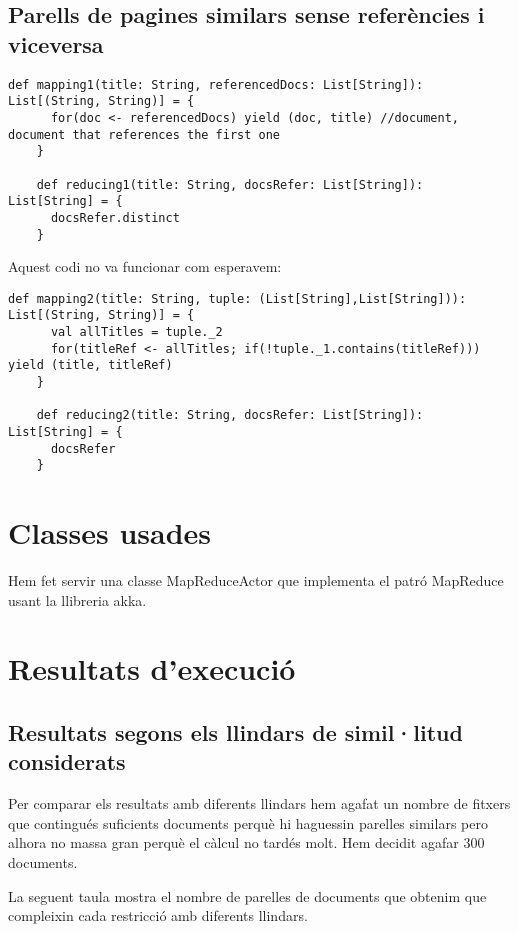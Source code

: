 \documentclass{report}
\begin{document}
\section{Parells de pagines similars sense referències i viceversa}

\begin{lstlisting}[style=scalaHighlight]
    def mapping1(title: String, referencedDocs: List[String]): List[(String, String)] = {
      for(doc <- referencedDocs) yield (doc, title) //document, document that references the first one
    }
  
    def reducing1(title: String, docsRefer: List[String]): List[String] = {
      docsRefer.distinct
    }
\end{lstlisting}

Aquest codi no va funcionar com esperavem:
\begin{lstlisting}[style=scalaHighlight]
    def mapping2(title: String, tuple: (List[String],List[String])): List[(String, String)] = {
      val allTitles = tuple._2
      for(titleRef <- allTitles; if(!tuple._1.contains(titleRef))) yield (title, titleRef)
    }
  
    def reducing2(title: String, docsRefer: List[String]): List[String] = {
      docsRefer
    }
\end{lstlisting}


\chapter{Classes usades}

Hem fet servir una classe MapReduceActor que implementa el patró MapReduce usant la llibreria akka.


\chapter{Resultats d'execució}

\section{Resultats segons els llindars de simil·litud considerats}

Per comparar els resultats amb diferents llindars hem agafat un nombre de fitxers que contingués suficients documents perquè hi haguessin parelles similars pero alhora no massa gran perquè el càlcul no tardés molt. Hem decidit agafar 300 documents.

La seguent taula mostra el nombre de parelles de documents que obtenim que compleixin cada restricció amb diferents llindars.
\end{document}
